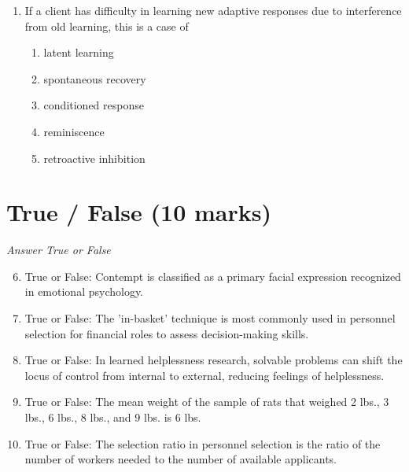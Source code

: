 \documentclass[12pt]{article}
\begin{document}
\begin{enumerate}[label=\arabic*.]
\begin{enumerate}[label=(\alph*)]
    \item a factorial research design has been used.
    \item a study's independent variable is quantitative.
    \item a cross-sectional research design has been used.
    \item a longitudinal research design has been used.
\end{enumerate}
\item If a client has difficulty in learning new adaptive responses due to interference from old learning, this is a case of
\begin{enumerate}[label=(\alph*)]
    \item latent learning
    \item spontaneous recovery
    \item conditioned response
    \item reminiscence
    \item retroactive inhibition
\end{enumerate}
\end{enumerate}

\section*{True / False (10 marks)}
\textit{Answer True or False}
\begin{enumerate}[label=\arabic*.]
\setcounter{enumi}{5}
\item True or False: Contempt is classified as a primary facial expression recognized in emotional psychology.
\item True or False: The 'in-basket' technique is most commonly used in personnel selection for financial roles to assess decision-making skills.
\item True or False: In learned helplessness research, solvable problems can shift the locus of control from internal to external, reducing feelings of helplessness.
\item True or False: The mean weight of the sample of rats that weighed 2 lbs., 3 lbs., 6 lbs., 8 lbs., and 9 lbs. is 6 lbs.
\item True or False: The selection ratio in personnel selection is the ratio of the number of workers needed to the number of available applicants.
\end{enumerate}
\end{document}
